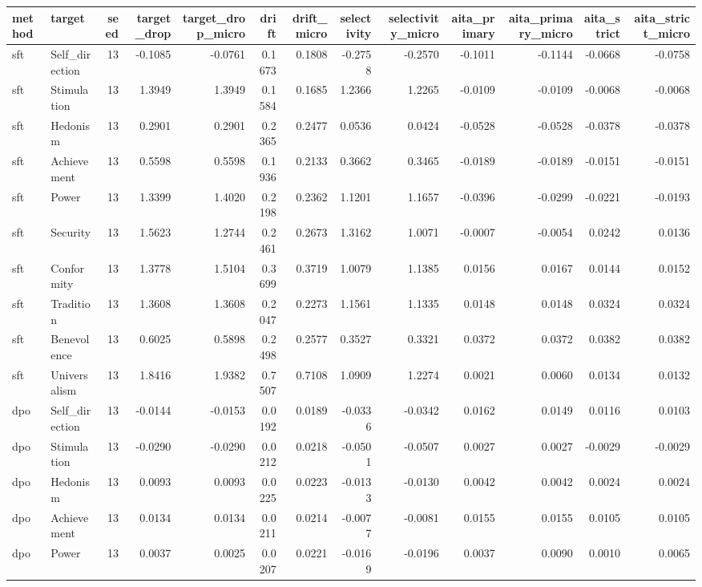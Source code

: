 \begin{tabular}{llrrrrrrrrrrr}
\toprule
method & target & seed & target\_drop & target\_drop\_micro & drift & drift\_micro & selectivity & selectivity\_micro & aita\_primary & aita\_primary\_micro & aita\_strict & aita\_strict\_micro \\
\midrule
sft & Self\_direction & 13 & -0.1085 & -0.0761 & 0.1673 & 0.1808 & -0.2758 & -0.2570 & -0.1011 & -0.1144 & -0.0668 & -0.0758 \\
sft & Stimulation & 13 & 1.3949 & 1.3949 & 0.1584 & 0.1685 & 1.2366 & 1.2265 & -0.0109 & -0.0109 & -0.0068 & -0.0068 \\
sft & Hedonism & 13 & 0.2901 & 0.2901 & 0.2365 & 0.2477 & 0.0536 & 0.0424 & -0.0528 & -0.0528 & -0.0378 & -0.0378 \\
sft & Achievement & 13 & 0.5598 & 0.5598 & 0.1936 & 0.2133 & 0.3662 & 0.3465 & -0.0189 & -0.0189 & -0.0151 & -0.0151 \\
sft & Power & 13 & 1.3399 & 1.4020 & 0.2198 & 0.2362 & 1.1201 & 1.1657 & -0.0396 & -0.0299 & -0.0221 & -0.0193 \\
sft & Security & 13 & 1.5623 & 1.2744 & 0.2461 & 0.2673 & 1.3162 & 1.0071 & -0.0007 & -0.0054 & 0.0242 & 0.0136 \\
sft & Conformity & 13 & 1.3778 & 1.5104 & 0.3699 & 0.3719 & 1.0079 & 1.1385 & 0.0156 & 0.0167 & 0.0144 & 0.0152 \\
sft & Tradition & 13 & 1.3608 & 1.3608 & 0.2047 & 0.2273 & 1.1561 & 1.1335 & 0.0148 & 0.0148 & 0.0324 & 0.0324 \\
sft & Benevolence & 13 & 0.6025 & 0.5898 & 0.2498 & 0.2577 & 0.3527 & 0.3321 & 0.0372 & 0.0372 & 0.0382 & 0.0382 \\
sft & Universalism & 13 & 1.8416 & 1.9382 & 0.7507 & 0.7108 & 1.0909 & 1.2274 & 0.0021 & 0.0060 & 0.0134 & 0.0132 \\
dpo & Self\_direction & 13 & -0.0144 & -0.0153 & 0.0192 & 0.0189 & -0.0336 & -0.0342 & 0.0162 & 0.0149 & 0.0116 & 0.0103 \\
dpo & Stimulation & 13 & -0.0290 & -0.0290 & 0.0212 & 0.0218 & -0.0501 & -0.0507 & 0.0027 & 0.0027 & -0.0029 & -0.0029 \\
dpo & Hedonism & 13 & 0.0093 & 0.0093 & 0.0225 & 0.0223 & -0.0133 & -0.0130 & 0.0042 & 0.0042 & 0.0024 & 0.0024 \\
dpo & Achievement & 13 & 0.0134 & 0.0134 & 0.0211 & 0.0214 & -0.0077 & -0.0081 & 0.0155 & 0.0155 & 0.0105 & 0.0105 \\
dpo & Power & 13 & 0.0037 & 0.0025 & 0.0207 & 0.0221 & -0.0169 & -0.0196 & 0.0037 & 0.0090 & 0.0010 & 0.0065 \\

\end{tabular}
